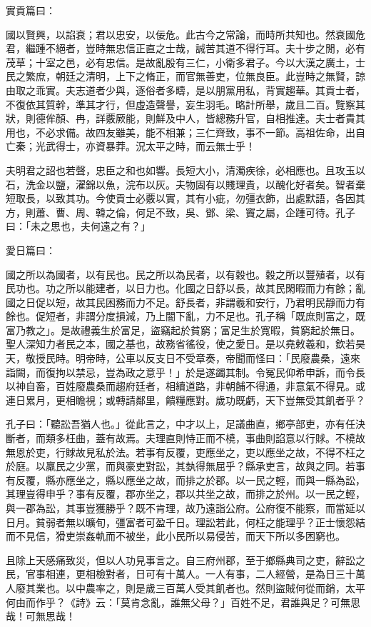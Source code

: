 \begin{pinyinscope}
實貢篇曰：

國以賢興，以諂衰；君以忠安，以佞危。此古今之常論，而時所共知也。然衰國危君，繼踵不絕者，豈時無忠信正直之士哉，誠苦其道不得行耳。夫十步之閒，必有茂草；十室之邑，必有忠信。是故亂殷有三仁，小衛多君子。今以大漢之廣土，士民之繁庶，朝廷之清明，上下之脩正，而官無善吏，位無良臣。此豈時之無賢，諒由取之乖實。夫志道者少與，逐俗者多疇，是以朋黨用私，背實趨華。其貢士者，不復依其質幹，準其才行，但虛造聲譽，妄生羽毛。略計所舉，歲且二百。覽察其狀，則德侔顏、冉，詳覈厥能，則鮮及中人，皆總務升官，自相推達。夫士者貴其用也，不必求備。故四友雖美，能不相兼；三仁齊致，事不一節。高祖佐命，出自亡秦；光武得士，亦資暴莽。況太平之時，而云無士乎！

夫明君之詔也若聲，忠臣之和也如響。長短大小，清濁疾徐，必相應也。且攻玉以石，洗金以鹽，濯錦以魚，浣布以灰。夫物固有以賤理貴，以醜化好者矣。智者棄短取長，以致其功。今使貢士必覈以實，其有小疵，勿彊衣飾，出處默語，各因其方，則蕭、曹、周、韓之倫，何足不致，吳、鄧、梁、竇之屬，企踵可待。孔子曰：「未之思也，夫何遠之有？」

愛日篇曰：

國之所以為國者，以有民也。民之所以為民者，以有穀也。穀之所以豐殖者，以有民功也。功之所以能建者，以日力也。化國之日舒以長，故其民閑暇而力有餘；亂國之日促以短，故其民困務而力不足。舒長者，非謂羲和安行，乃君明民靜而力有餘也。促短者，非謂分度損減，乃上闇下亂，力不足也。孔子稱「既庶則富之，既富乃教之」。是故禮義生於富足，盜竊起於貧窮；富足生於寬暇，貧窮起於無日。聖人深知力者民之本，國之基也，故務省徭役，使之愛日。是以堯敕羲和，欽若昊天，敬授民時。明帝時，公車以反支日不受章奏，帝聞而怪曰：「民廢農桑，遠來詣闕，而復拘以禁忌，豈為政之意乎！」於是遂蠲其制。令冤民仰希申訴，而令長以神自畜，百姓廢農桑而趨府廷者，相續道路，非朝餔不得通，非意氣不得見。或連日累月，更相瞻視；或轉請鄰里，饋糧應對。歲功既虧，天下豈無受其飢者乎？

孔子曰：「聽訟吾猶人也。」從此言之，中才以上，足議曲直，鄉亭部吏，亦有任決斷者，而類多枉曲，蓋有故焉。夫理直則恃正而不橈，事曲則諂意以行賕。不橈故無恩於吏，行賕故見私於法。若事有反覆，吏應坐之，吏以應坐之故，不得不枉之於庭。以羸民之少黨，而與豪吏對訟，其埶得無屈乎？縣承吏言，故與之同。若事有反覆，縣亦應坐之，縣以應坐之故，而排之於郡。以一民之輕，而與一縣為訟，其理豈得申乎？事有反覆，郡亦坐之，郡以共坐之故，而排之於州。以一民之輕，與一郡為訟，其事豈獲勝乎？既不肯理，故乃遠詣公府。公府復不能察，而當延以日月。貧弱者無以曠旬，彊富者可盈千日。理訟若此，何枉之能理乎？正士懷怨結而不見信，猾吏崇姦軌而不被坐，此小民所以易侵苦，而天下所以多困窮也。

且除上天感痛致災，但以人功見事言之。自三府州郡，至于鄉縣典司之吏，辭訟之民，官事相連，更相檢對者，日可有十萬人。一人有事，二人經營，是為日三十萬人廢其業也。以中農率之，則是歲三百萬人受其飢者也。然則盜賊何從而銷，太平何由而作乎？《詩》云：「莫肯念亂，誰無父母？」百姓不足，君誰與足？可無思哉！可無思哉！


\end{pinyinscope}
